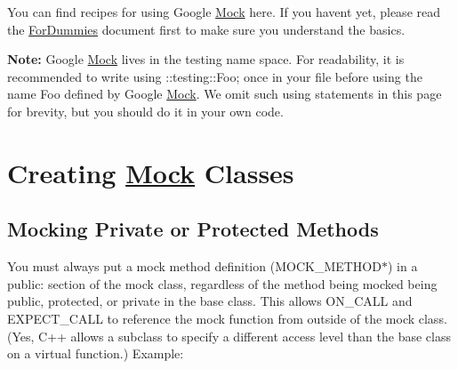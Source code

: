 You can find recipes for using Google \mbox{\hyperlink{classMock}{Mock}} here. If you haven\textquotesingle{}t yet, please read the \mbox{\hyperlink{ForDummies_8md}{For\+Dummies}} document first to make sure you understand the basics.

{\bfseries{Note\+:}} Google \mbox{\hyperlink{classMock}{Mock}} lives in the {\ttfamily testing} name space. For readability, it is recommended to write {\ttfamily using \+::testing\+::\+Foo;} once in your file before using the name {\ttfamily Foo} defined by Google \mbox{\hyperlink{classMock}{Mock}}. We omit such {\ttfamily using} statements in this page for brevity, but you should do it in your own code.

\section*{Creating \mbox{\hyperlink{classMock}{Mock}} Classes}

\subsection*{Mocking Private or Protected Methods}

You must always put a mock method definition ({\ttfamily M\+O\+C\+K\+\_\+\+M\+E\+T\+H\+O\+D$\ast$}) in a {\ttfamily public\+:} section of the mock class, regardless of the method being mocked being {\ttfamily public}, {\ttfamily protected}, or {\ttfamily private} in the base class. This allows {\ttfamily O\+N\+\_\+\+C\+A\+LL} and {\ttfamily E\+X\+P\+E\+C\+T\+\_\+\+C\+A\+LL} to reference the mock function from outside of the mock class. (Yes, C++ allows a subclass to specify a different access level than the base class on a virtual function.) Example\+:


\begin{DoxyCode}{0}
\DoxyCodeLine{}
\DoxyCodeLine{}
\DoxyCodeLine{\};}
\DoxyCodeLine{}
\DoxyCodeLine{}
\DoxyCodeLine{\};}
\end{DoxyCode}


